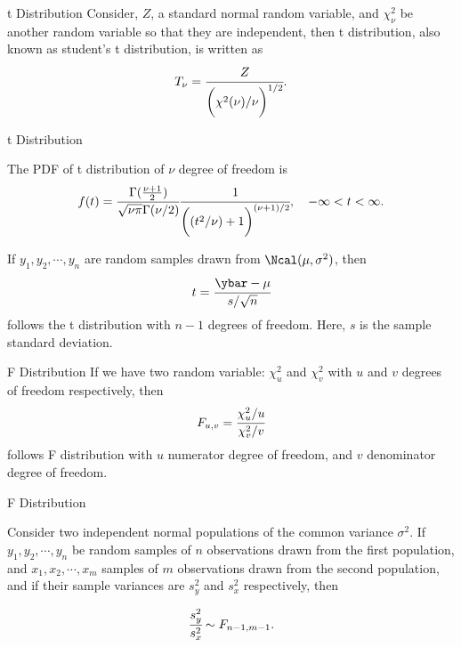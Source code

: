 \documentclass[aspectratio=169,xcolor=dvipsnames,svgnames,x11names,fleqn]{beamer}
\begin{document}
    \begin{frame}{t Distribution}
    Consider, $Z$, a standard normal random variable, and $\chi^2_\nu$ be another random variable so that they are independent, then
        t distribution, also known as student's t distribution, is written as
        $$
        T_\nu = \cfrac{Z}{\bigg(\chi^2(\nu)/\nu\bigg)^{1/2}}.
        $$

            \end{frame}
    
    \begin{frame}{t Distribution}
    
        The PDF of t distribution of $\nu$ degree of freedom is 
        \begin{equation}
            f(t) = \cfrac{\Gamma( \tfrac{\nu+1}{2})}{\sqrt{\nu \pi}\Gamma(\nu/2)} \cfrac{1}{\bigg((t^2/\nu) + 1\bigg) ^{(\nu+1)/2}}, \quad -\infty < t < \infty.
        \end{equation}
    
        If $y_1, y_2, \cdots, y_n$ are random samples drawn from $\Ncal(\mu, \sigma^2)$, then 
        \begin{equation}
            t = \cfrac{\ybar - \mu}{s/\sqrt{n}}
        \end{equation}
        follows the t distribution with $n-1$ degrees of freedom. Here, $s$ is the sample standard deviation.
    \end{frame}
    
    \begin{frame}{F Distribution}
    If we have two random variable: $\chi^2_u$ and $\chi^2_v$ with $u$ and $v$ degrees of freedom respectively, then 
    \begin{equation}
        F_{u, v} = \cfrac{\chi^2_u/u}{\chi^2_v/v}
    \end{equation}
    follows F distribution with $u$ numerator degree of freedom, and $v$ denominator degree of freedom.

\end{frame}
    
\begin{frame}{F Distribution}
    
    Consider two independent normal populations of the common variance $\sigma^2$. If $y_1, y_2, \cdots, y_n$ be random samples of $n$ observations drawn from the first population, and $x_1, x_2, \cdots, x_m$ samples of $m$ observations drawn from the second population, and if their sample variances are $s_y^2$ and $s_x^2$ respectively, then
    
    \begin{equation}
        \cfrac{s_y^2}{s_x^2} \sim F_{n-1, m-1}.
    \end{equation}
    
    \end{frame}
    
\end{document}
